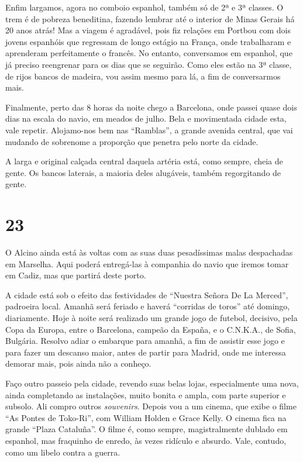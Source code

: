 Enfim largamos, agora no comboio espanhol, também só de 2ª e 3ª classes. O trem é de pobreza beneditina, fazendo lembrar até o interior de Minas Gerais há 20 anos atrás! Mas a viagem é agradável, pois fiz relações em Portbou com dois jovens espanhóis que regressam de longo estágio na França, onde trabalharam e aprenderam perfeitamente o francês. No entanto, conversamos em espanhol, que já preciso reengrenar para os dias que se seguirão. Como eles estão na 3ª classe, de rijos bancos de madeira, vou assim mesmo para lá, a fim de conversarmos mais.

Finalmente, perto das 8 horas da noite chego a Barcelona, onde passei quase dois dias na escala do navio, em meados de julho. Bela e movimentada cidade esta, vale repetir. Alojamo-nos bem nas ``Ramblas'', a grande avenida central, que vai mudando de sobrenome a proporção que penetra pelo norte da cidade.

A larga e original calçada central daquela artéria está, como sempre, cheia de gente. Os bancos laterais, a maioria deles alugáveis, também regorgitando de gente.

\section*{23 \adfflatleafright {}}
O Alcino ainda está às voltas com as suas duas pesadíssimas malas despachadas em Marselha. Aqui poderá entregá-las à companhia do navio que iremos tomar em Cadiz, mas que partirá deste porto.

A cidade está sob o efeito das festividades de ``Nuestra Señora De La Merced'', padroeira local. Amanhã será feriado e haverá ``corridas de toros'' até domingo, diariamente. Hoje à noite será realizado um grande jogo de futebol, decisivo, pela Copa da Europa, entre o Barcelona, campeão da España, e o C.N.K.A., de Sofia, Bulgária. Resolvo adiar o embarque para amanhã, a fim de assistir esse jogo e para fazer um descanso maior, antes de partir para Madrid, onde me interessa demorar mais, pois ainda não a conheço.

Faço outro passeio pela cidade, revendo suas belas lojas, especialmente uma nova, ainda completando as instalações, muito bonita e ampla, com parte superior e subsolo. Ali compro outros \textit{souvenirs}. Depois vou a um cinema, que exibe o filme ``As Pontes de Toko-Ri'', com William Holden e Grace Kelly. O cinema fica na grande ``Plaza Cataluña''. O filme é, como sempre, magistralmente dublado em espanhol, mas fraquinho de enredo, às vezes ridículo e absurdo. Vale, contudo, como um libelo contra a guerra.

